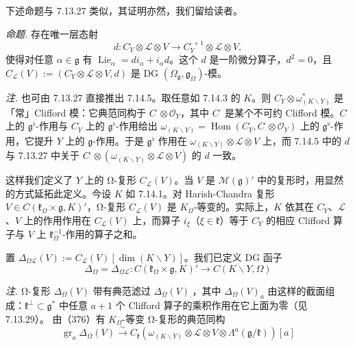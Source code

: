 下述命题与 7.13.27 类似，其证明亦然，我们留给读者。

 \emph{命题.} 存在唯一层态射
\[
d:C_Y^{\cdot}\otimes\mathcal{L}\otimes V\to C_Y^{\cdot+1}\otimes\mathcal{L}\otimes V,
\]
使得对任意 $\alpha\in\mathfrak{g}$ 有 $\operatorname{Lie}_{\alpha}=di_{\alpha}+i_{\alpha}d$。这个 $d$ 是一阶微分算子，$d^2=0$，且 $C_{\mathcal{L}}(V):=(C_Y^{\cdot}\otimes\mathcal{L}\otimes V,d)$ 是 DG $(\Omega_{\mathfrak{g}},\mathfrak{g}_{\Omega})$-模。

\emph{注.} 也可由 7.13.27 直接推出 7.14.5。取任意如 7.14.3 的 $K$。则 $C_Y^{\cdot}\otimes\omega^{\ast}_{(K\backslash Y)}$ 是「常」Clifford 模：它典范同构于 $C^{\cdot}\otimes\mathcal{O}_Y$，其中 $C^{\cdot}$ 是某个不可约 Clifford 模。$C^{\cdot}$ 上的 $\mathfrak{g}^{\flat}$-作用与 $C_Y^{\cdot}$ 上的 $\mathfrak{g}^{\flat}$-作用给出 $\omega_{(K\backslash Y)}=\operatorname{Hom}(C_Y^{\cdot},C^{\cdot}\otimes\mathcal{O}_Y)$ 上的 $\mathfrak{g}^{\flat}$-作用，它提升 $Y$ 上的 $\mathfrak{g}$-作用。于是 $\mathfrak{g}^{\flat}$ 作用在 $\omega_{(K\backslash Y)}\otimes\mathcal{L}\otimes V$ 上，而 7.14.5 中的 $d$ 与 7.13.27 中关于 $C^{\cdot}\otimes(\omega_{(K\backslash Y)}\otimes\mathcal{L}\otimes V)$ 的 $d$ 一致。

 这样我们定义了 $Y$ 上的 Ω-复形 $C_{\mathcal{L}}(V)$。当 $V$ 是 $\mathcal{M}(\mathfrak{g})'$ 中的复形时，用显然的方式延拓此定义。今设 $K$ 如 7.14.1。对 Harish-Chandra 复形 $V\in C(\mathfrak{k}_{\Omega}\times\mathfrak{g},K)'$，Ω-复形 $C_{\mathcal{L}}(V)$ 是 $K_{\Omega}$-等变的。实际上，$K$ 依其在 $C_Y^{\cdot}$、$\mathcal{L}$、$V$ 上的作用作用在 $C_{\mathcal{L}}(V)$ 上，而算子 $i_{\xi}$（$\xi\in\mathfrak{k}$）等于 $C_Y^{\cdot}$ 的相应 Clifford 算子与 $V$ 上 $\mathfrak{k}_{\Omega}^{-1}$-作用的算子之和。

置 $\Delta_{\Omega\mathcal{L}}(V):=C_{\mathcal{L}}(V)[\dim(K\backslash Y)]$。我们已定义 DG 函子
\begin{equation}\tag{379}
\Delta_{\Omega}=\Delta_{\Omega\mathcal{L}}:C(\mathfrak{k}_{\Omega}\times\mathfrak{g},K)'\longrightarrow C(K\backslash Y,\Omega)
\end{equation}

 \emph{注.} Ω-复形 $\Delta_{\Omega}(V)$ 带有典范滤过 $\Delta_{\Omega}(V)_{\cdot}$，其中 $\Delta_{\Omega}(V)_a$ 由这样的截面组成：$\mathfrak{k}^{\perp}\subset\mathfrak{g}^{*}$ 中任意 $a+1$ 个 Clifford 算子的乘积作用在它上面为零（见 7.13.29）。%
由（376）有 $K_{\Omega}$-等变 Ω-复形的典范同构
\begin{equation}\tag{380}
\operatorname{gr}_a\Delta_{\Omega}(V)\xrightarrow{\ \sim\ }C_{\mathfrak{k}}(\omega_{(K\backslash Y)}\otimes\mathcal{L}\otimes V\otimes\Lambda^{a}(\mathfrak{g}/\mathfrak{k}))[a]
\end{equation}

